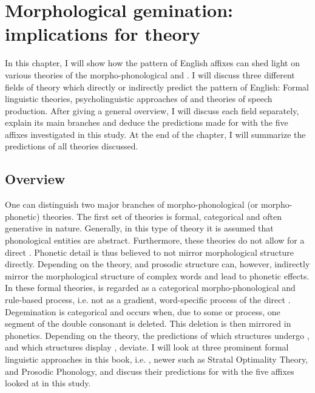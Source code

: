 \chapter {Morphological gemination: implications for theory} \label{Theory}

In this chapter, I will show how the  pattern of English affixes can shed light on various theories of the morpho-phonological and . I will discuss three different fields of theory which directly or indirectly predict the  pattern of English: Formal linguistic theories, psycholinguistic approaches of  and theories of speech production. After giving a general overview, I will discuss each field  separately, explain its main branches and deduce the predictions made for  with the five affixes investigated in this study.  At the end of the chapter, I will summarize the predictions of all theories discussed.\\


\section{Overview}
One can distinguish two major branches of morpho-phonological (or morpho-phonetic) theories. The first set of theories is formal, categorical and often generative in nature. Generally, in this type of theory it is assumed that phonological entities are abstract. Furthermore, these theories do not allow for a direct . Phonetic detail is thus believed to not mirror morphological structure directly. Depending on the theory,  and prosodic structure can, however, indirectly mirror the morphological structure of complex words and lead to phonetic effects. 
In these formal theories,  is regarded as a categorical morpho-phonological and rule-based process, i.e. not as a gradient, word-specific process of the direct . Degemination is categorical and occurs when, due to some  or process, one segment of the double consonant is deleted. This deletion is then mirrored in phonetics. Depending on the theory, the predictions of which structures undergo , and which structures display , deviate. I will look at three prominent formal linguistic approaches in this book, i.e. , newer  such as Stratal Optimality Theory, and Prosodic Phonology,  and discuss their predictions for  with the five affixes looked at in this study. 

